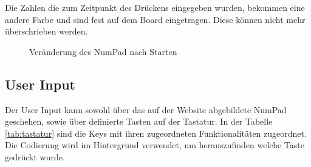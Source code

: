 Die Zahlen die zum Zeitpunkt des Drückens eingegeben wurden, bekommen eine andere Farbe und sind fest auf dem Board eingetragen. Diese können nicht mehr überschrieben werden.


\begin{figure}[H]
	\centering
	\qquad
	\caption{Veränderung des NumPad nach Starten}%
\end{figure}

\subsection{User Input}

Der User Input kann sowohl über das auf der Website abgebildete NumPad geschehen, sowie über definierte Tasten auf der Tastatur. In der Tabelle \ref{tab:tastatur} sind die Keys mit ihren zugeordneten Funktionalitäten zugeordnet. Die Codierung wird im Hintergrund verwendet, um herauszufinden welche Taste gedrückt wurde.

